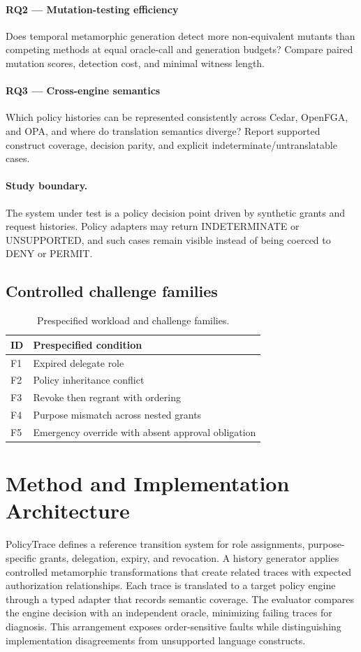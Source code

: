 \documentclass[11pt,a4paper]{article}
\begin{document}
\paragraph{RQ2 — Mutation-testing efficiency} Does temporal metamorphic generation detect more non-equivalent mutants than competing methods at equal oracle-call and generation budgets? Compare paired mutation scores, detection cost, and minimal witness length.

\paragraph{RQ3 — Cross-engine semantics} Which policy histories can be represented consistently across Cedar, OpenFGA, and OPA, and where do translation semantics diverge? Report supported construct coverage, decision parity, and explicit indeterminate/untranslatable cases.

\paragraph{Study boundary.} The system under test is a policy decision point driven by synthetic grants and request histories. Policy adapters may return INDETERMINATE or UNSUPPORTED, and such cases remain visible instead of being coerced to DENY or PERMIT.

\subsection{Controlled challenge families}
\begin{table}[ht]
\centering\small
\caption{Prespecified workload and challenge families.}
\begin{tabularx}{\linewidth}{@{}lX@{}}\toprule
ID & Prespecified condition \\ \midrule
F1 & Expired delegate role \\ 
F2 & Policy inheritance conflict \\ 
F3 & Revoke then regrant with ordering \\ 
F4 & Purpose mismatch across nested grants \\ 
F5 & Emergency override with absent approval obligation \\ 
\bottomrule\end{tabularx}\end{table}

\section{Method and Implementation Architecture}
PolicyTrace defines a reference transition system for role assignments, purpose-specific grants, delegation, expiry, and revocation. A history generator applies controlled metamorphic transformations that create related traces with expected authorization relationships. Each trace is translated to a target policy engine through a typed adapter that records semantic coverage. The evaluator compares the engine decision with an independent oracle, minimizing failing traces for diagnosis. This arrangement exposes order-sensitive faults while distinguishing implementation disagreements from unsupported language constructs.
\end{document}
